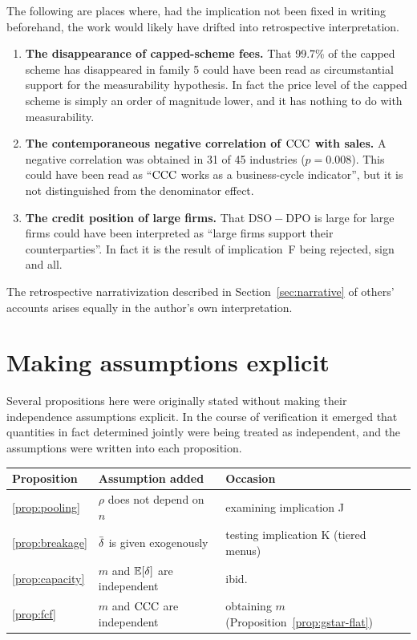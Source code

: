 The following are places where, had the implication not been fixed in writing beforehand, the work
would likely have drifted into retrospective interpretation.

\begin{enumerate}[label=(\arabic*)]
\item \textbf{The disappearance of capped-scheme fees.}
That 99.7\% of the capped scheme has disappeared in family 5 could have been read as
circumstantial support for the measurability hypothesis. In fact the price level of the capped
scheme is simply an order of magnitude lower, and it has nothing to do with measurability.

\item \textbf{The contemporaneous negative correlation of $\mathrm{CCC}$ with sales.}
A negative correlation was obtained in 31 of 45 industries ($p=0.008$). This could have been read
as ``$\mathrm{CCC}$ works as a business-cycle indicator'', but it is not distinguished from the
denominator effect.

\item \textbf{The credit position of large firms.}
That $\mathrm{DSO}-\mathrm{DPO}$ is large for large firms could have been interpreted as ``large
firms support their counterparties''. In fact it is the result of implication~F being rejected,
sign and all.
\end{enumerate}

The retrospective narrativization described in Section~\ref{sec:narrative} of others' accounts
arises equally in the author's own interpretation.

\section{Making assumptions explicit}

Several propositions here were originally stated without making their independence assumptions
explicit. In the course of verification it emerged that quantities in fact determined jointly were
being treated as independent, and the assumptions were written into each proposition.

\begin{center}
\begin{tabularx}{\textwidth}{@{}lXl@{}}
\toprule
Proposition & Assumption added & Occasion \\
\midrule
\ref{prop:pooling} & $\rho$ does not depend on $n$ & examining implication J \\
\ref{prop:breakage} & $\dbar$ is given exogenously & testing implication K (tiered menus) \\
\ref{prop:capacity} & $m$ and $\mathbb{E}[\delta]$ are independent & ibid. \\
\ref{prop:fcf} & $m$ and $\mathrm{CCC}$ are independent & obtaining $m$ (Proposition~\ref{prop:gstar-flat}) \\
\bottomrule
\end{tabularx}
\label{tab:assumption-additions}
\end{center}


